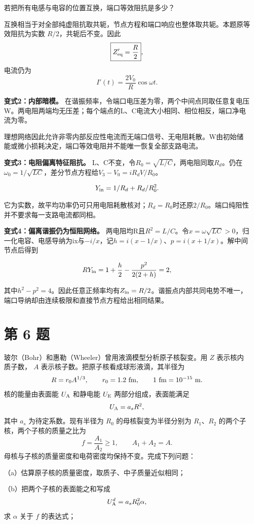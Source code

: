 \documentclass[12pt,a4paper,UTF8]{ctexart}
\begin{document}
若把所有电感与电容的位置互换，端口等效阻抗是多少？

互换相当于对全部纯虚阻抗取共轭，节点方程和端口响应也整体取共轭。本题原等效阻抗为实数
\(R/2\)，共轭后不变。因此 \[
\boxed{Z'_{\rm eq}=\frac R2},
\] 电流仍为 \[
\boxed{
I'(t)=\frac{2V_0}{R}\cos\omega t
}.
\]

\textbf{变式2：内部暗模。}
在谐振频率，令端口电压差为零，两个中间点同取任意复电压W。两电阻两端均无压差；每个端点的L、C电流大小相同、相位相反，端口净电流为零。

理想网络因此允许非零内部反应性电流而无端口信号、无电阻耗散。W由初始储能或微小损耗决定，端口等效电阻并不能唯一恢复全部支路电流。

\textbf{变式3：电阻偏离特征阻抗。}
L、C不变，令\(R_0=\sqrt{L/C}\)，两电阻同取\(R_d\)。仍在\(\omega_0=1/\sqrt{LC}\)，差分节点方程给\(V_3-V_0=iR_dV/R_0\)。

\[Y_{\rm in}=1/R_d+R_d/R_0^2.\]

它为实数，故平均功率仍可只用电阻耗散核对；\(R_d=R_0\)时还原\(2/R_0\)。端口纯阻性并不要求每一支路电流都同相。

\textbf{变式4：偏离谐振仍为恒阻网络。}
两电阻均R且\(R^2=L/C\)。令\(x=\omega\sqrt{LC}>0\)，归一化电容、电感导纳为ix与\(-i/x\)，记\(h=i(x-1/x)\)、\(p=i(x+1/x)\)。解中间节点后得到

\[RY_{\rm in}=1+\frac h2-\frac{p^2}{2(2+h)}=2,\]

其中\(h^2-p^2=4\)。因此任意正频率均有\(Z_{\rm in}=R/2\)。谐振点内部共同电势不唯一，端口导纳却由连续极限和直接节点方程给出相同结果。

\newpage

\section{第 6 题}\label{ux7b2c-6-ux9898}

玻尔（Bohr）和惠勒（Wheeler）曾用液滴模型分析原子核裂变。用 \(Z\)
表示核内质子数， \(A\) 表示核子数。把原子核看成球形液滴，其半径为 \[
R=r_0A^{1/3},
\qquad
r_0=1.2\ {\rm fm},
\qquad
1\ {\rm fm}=10^{-15}\ {\rm m}.
\] 核的能量由表面能 \(U_{\rm A}\) 和静电能 \(U_{\rm E}\)
两部分组成，表面能满足 \[
U_{\rm A}=a_sR^2,
\] 其中 \(a_s\) 为待定系数。现有半径为 \(R_0\) 的母核裂变为半径分别为
\(R_1\)、\(R_2\) 的两个子核，两个子核的质量之比为 \[
f=\frac{A_1}{A_2}\geqslant 1,
\qquad
A_1+A_2=A.
\] 母核与子核的质量密度和电荷密度均保持不变。完成下列问题：

（a）估算原子核的质量密度，取质子、中子质量近似相同；

（b）把两个子核的表面能之和写成 \[
U_{\rm A}^{d}=a_sR_0^2\alpha,
\] 求 \(\alpha\) 关于 \(f\) 的表达式；
\end{document}
